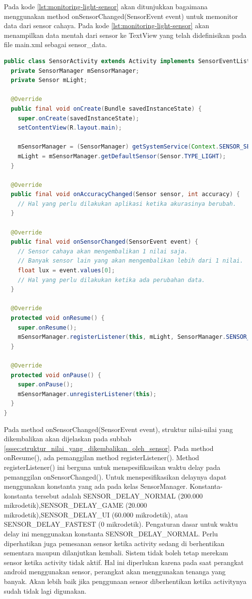 Pada kode \ref{lst:monitoring-light-sensor} akan ditunjukkan bagaimana menggunakan method onSensorChanged(SensorEvent event) untuk memonitor data dari sensor cahaya. Pada kode \ref{lst:monitoring-light-sensor} akan menampilkan data mentah dari sensor ke TextView yang telah didefinisikan pada file main.xml sebagai sensor\_data.
\begin{lstlisting}[caption={Contoh memonitor data mentah pada sensor cahaya},label={lst:monitoring-light-sensor},language=java]
public class SensorActivity extends Activity implements SensorEventListener {
  private SensorManager mSensorManager;
  private Sensor mLight;

  @Override
  public final void onCreate(Bundle savedInstanceState) {
    super.onCreate(savedInstanceState);
    setContentView(R.layout.main);

    mSensorManager = (SensorManager) getSystemService(Context.SENSOR_SERVICE);
    mLight = mSensorManager.getDefaultSensor(Sensor.TYPE_LIGHT);
  }

  @Override
  public final void onAccuracyChanged(Sensor sensor, int accuracy) {
    // Hal yang perlu dilakukan aplikasi ketika akurasinya berubah.
  }

  @Override
  public final void onSensorChanged(SensorEvent event) {
    // Sensor cahaya akan mengembalikan 1 nilai saja.
    // Banyak sensor lain yang akan mengembalikan lebih dari 1 nilai.
    float lux = event.values[0];
    // Hal yang perlu dilakukan ketika ada perubahan data.
  }

  @Override
  protected void onResume() {
    super.onResume();
    mSensorManager.registerListener(this, mLight, SensorManager.SENSOR_DELAY_NORMAL);
  }

  @Override
  protected void onPause() {
    super.onPause();
    mSensorManager.unregisterListener(this);
  }
}
\end{lstlisting}
Pada method onSensorChanged(SensorEvent event), struktur nilai-nilai yang dikembalikan akan dijelaskan pada subbab \ref{sssec:struktur_nilai_yang_dikembalikan_oleh_sensor}. Pada method onResume(), ada pemanggilan method registerListener(). Method registerListener() ini berguna untuk menspesifikasikan waktu delay pada pemanggilan onSensorChanged(). Untuk menspesifikasikan delaynya dapat menggunakan konstanta yang ada pada kelas SensorManager. Konstanta-konstanta tersebut adalah SENSOR\_DELAY\_NORMAL (200.000 mikrodetik),SENSOR\_DELAY\_GAME (20.000 mikrodetik),SENSOR\_DELAY\_UI (60.000 mikrodetik), atau SENSOR\_DELAY\_FASTEST (0 mikrodetik). Pengaturan dasar untuk waktu delay ini menggunakan konstanta SENSOR\_DELAY\_NORMAL.
Perlu diperhatikan juga pemesanan sensor ketika activity sedang di berhentikan sementara maupun dilanjutkan kembali. Sistem tidak boleh tetap merekam sensor ketika activity tidak aktif. Hal ini diperlukan karena pada saat perangkat android menggunakan sensor, perangkat akan menggunakan tenanga yang banyak. Akan lebih baik jika penggunaan sensor diberhentikan ketika activitynya sudah tidak lagi digunakan. 
